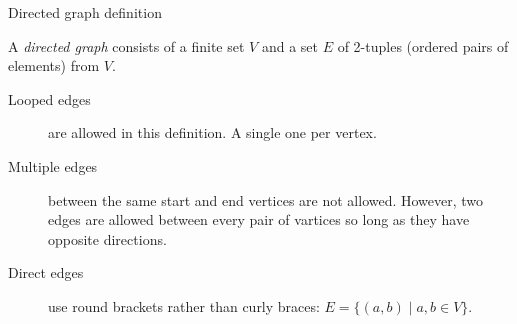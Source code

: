 \begin{frame}{Directed graph definition}
	\begin{definition}
	A \emph{directed graph} consists of a finite set $V$ and a set $E$ of 2-tuples (ordered pairs of elements) from $V$.
	\end{definition}
	\vspace{0.2cm}
	\begin{description}
		\item[Looped edges] are allowed in this definition. A single one per vertex.
		\item[Multiple edges] between the same start and end vertices are not allowed. However, two edges are allowed between every pair of vartices so long as they have opposite directions.
		\item[Direct edges] use round brackets rather than curly braces: $E = \{ (a,b) \mid a,b \in V\}$.
	\end{description}
\end{frame}


